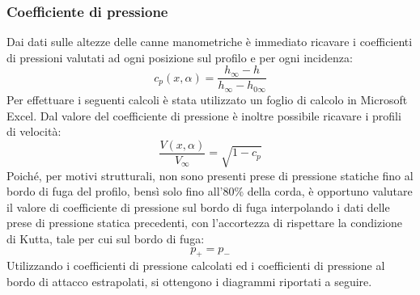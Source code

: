 \subsubsection{Coefficiente di pressione}
Dai dati sulle altezze delle canne manometriche è immediato ricavare i coefficienti di pressioni valutati ad ogni posizione sul profilo e per ogni incidenza:
\begin{equation*}
    c_p(x,\alpha) = \frac{h_\infty-h}{h_\infty - h_{0\infty}}
\end{equation*}
Per effettuare i seguenti calcoli è stata utilizzato un foglio di calcolo in Microsoft Excel. Dal valore del coefficiente di pressione è inoltre possibile ricavare i profili di velocità:
\begin{equation*}
    \frac{V(x,\alpha)}{V_\infty} = \sqrt{1-c_p}
\end{equation*}
Poiché, per motivi strutturali, non sono presenti prese di pressione statiche fino al bordo di fuga del profilo, bensì solo fino all'80\% della corda, è opportuno valutare il valore di coefficiente di pressione sul bordo di fuga interpolando i dati delle prese di pressione statica precedenti, con l'accortezza di rispettare la condizione di Kutta, tale per cui sul bordo di fuga:
\begin{equation*}
    p_+ = p_-
\end{equation*}
Utilizzando i coefficienti di pressione calcolati ed i coefficienti di pressione al bordo di attacco estrapolati, si ottengono i diagrammi riportati a seguire.
